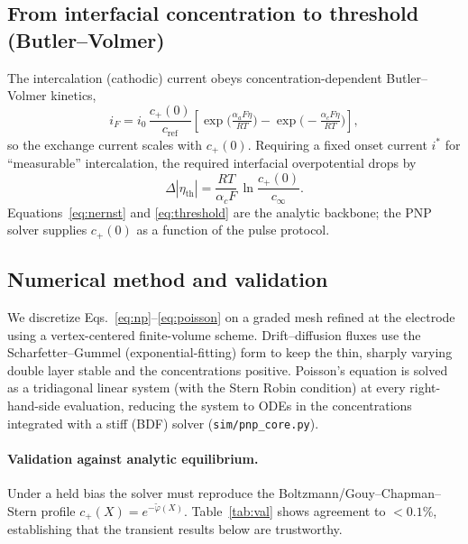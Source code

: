 \documentclass[11pt,a4paper]{article}
\newcommand{\cinf}{\ensuremath{c_{\infty}}}
\newcommand{\cs}{\ensuremath{c_{+}(0)}}
\begin{document}
\subsection{From interfacial concentration to threshold (Butler--Volmer)}
The intercalation (cathodic) current obeys concentration-dependent
Butler--Volmer kinetics,
\begin{equation}
i_F = i_0\,\frac{\cs}{c_{\mathrm{ref}}}
      \left[\exp\!\Big(\tfrac{\alpha_a F\eta}{RT}\Big)
          - \exp\!\Big(\!-\tfrac{\alpha_c F\eta}{RT}\Big)\right],
\label{eq:bv}
\end{equation}
so the exchange current scales with $\cs$. Requiring a fixed onset current $i^*$
for ``measurable'' intercalation, the required interfacial overpotential drops by
\begin{equation}
\Delta|\eta_{\mathrm{th}}| = \frac{RT}{\alpha_c F}\,\ln\!\frac{\cs}{\cinf}.
\label{eq:threshold}
\end{equation}
Equations~\eqref{eq:nernst} and \eqref{eq:threshold} are the analytic backbone;
the PNP solver supplies $\cs$ as a function of the pulse protocol.

\subsection{Numerical method and validation}
We discretize Eqs.~\eqref{eq:np}--\eqref{eq:poisson} on a graded mesh refined at
the electrode using a vertex-centered finite-volume scheme. Drift--diffusion
fluxes use the Scharfetter--Gummel (exponential-fitting) form to keep the thin,
sharply varying double layer stable and the concentrations positive. Poisson's
equation is solved as a tridiagonal linear system (with the Stern Robin
condition) at every right-hand-side evaluation, reducing the system to ODEs in
the concentrations integrated with a stiff (BDF) solver
(\texttt{sim/pnp\_core.py}).

\paragraph{Validation against analytic equilibrium.} Under a held bias the solver
must reproduce the Boltzmann/Gouy--Chapman--Stern profile $c_+(X)=e^{-\tilde
\varphi(X)}$. Table~\ref{tab:val} shows agreement to $<0.1\%$, establishing that
the transient results below are trustworthy.
\end{document}
